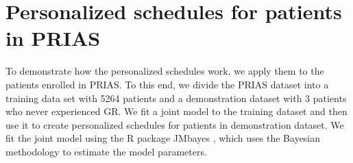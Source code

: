 
\section{Personalized schedules for patients in PRIAS}
\label{sec : pers_schedule_PRIAS}
To demonstrate how the personalized schedules work, we apply them to the patients enrolled in PRIAS. To this end, we divide the PRIAS dataset into a training data set with 5264 patients and a demonstration dataset with 3 patients who never experienced GR. We fit a joint model to the training dataset and then use it to create personalized schedules for patients in demonstration dataset. We fit the joint model using the R package JMbayes \citep{rizopoulosJMbayes}, which uses the Bayesian methodology to estimate the model parameters.

